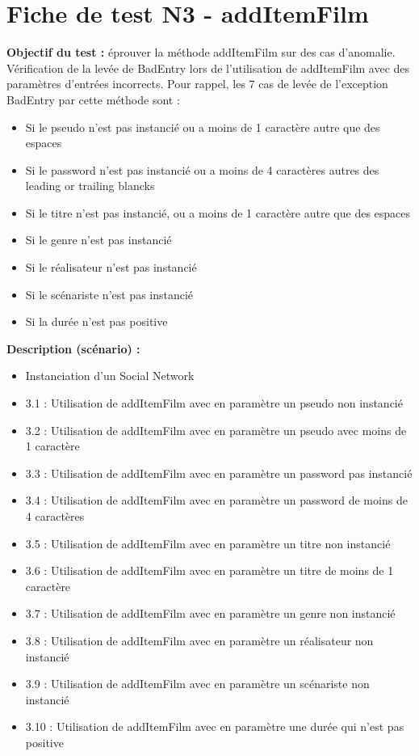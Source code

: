 \documentclass[12pt,a4paper]{report}
\begin{document}
\appendix
\chapter{Fiche de test N3 - addItemFilm}
\textbf{Objectif du test :} éprouver la méthode addItemFilm sur des cas d'anomalie.
Vérification de la levée de BadEntry lors de l’utilisation de addItemFilm avec des paramètres d'entrées incorrects.
Pour rappel, les 7 cas de levée de l'exception BadEntry par cette méthode sont :
\begin{itemize}
\item Si le pseudo n'est pas instancié ou a moins de 1 caractère autre que des espaces
\item Si le password n'est pas instancié ou a moins de 4 caractères autres des leading or trailing blancks
\item Si le titre n'est pas instancié, ou a moins de 1 caractère autre que des espaces
\item Si le genre n'est pas instancié
\item Si le réalisateur n'est pas instancié
\item Si le scénariste n'est pas instancié
\item Si la durée n'est pas positive
\end{itemize}

\textbf{Description (scénario) :}
\begin{itemize}
	\item	Instanciation d'un Social Network
	\item	3.1 : Utilisation de addItemFilm avec en paramètre un pseudo non instancié
	\item	3.2 : Utilisation de addItemFilm avec en paramètre un pseudo avec moins de 1 caractère
	\item	3.3 : Utilisation de addItemFilm avec en paramètre un password pas instancié
	\item	3.4 : Utilisation de addItemFilm avec en paramètre un password de moins de 4 caractères
	\item	3.5 : Utilisation de addItemFilm avec en paramètre un titre non instancié
	\item	3.6 : Utilisation de addItemFilm avec en paramètre un titre de moins de 1 caractère
	\item	3.7 : Utilisation de addItemFilm avec en paramètre un genre non instancié
	\item	3.8 : Utilisation de addItemFilm avec en paramètre un réalisateur non instancié
	\item	3.9 : Utilisation de addItemFilm avec en paramètre un scénariste non instancié
	\item	3.10 : Utilisation de addItemFilm avec en paramètre une durée qui n'est pas positive

\end{itemize}
\end{document}
